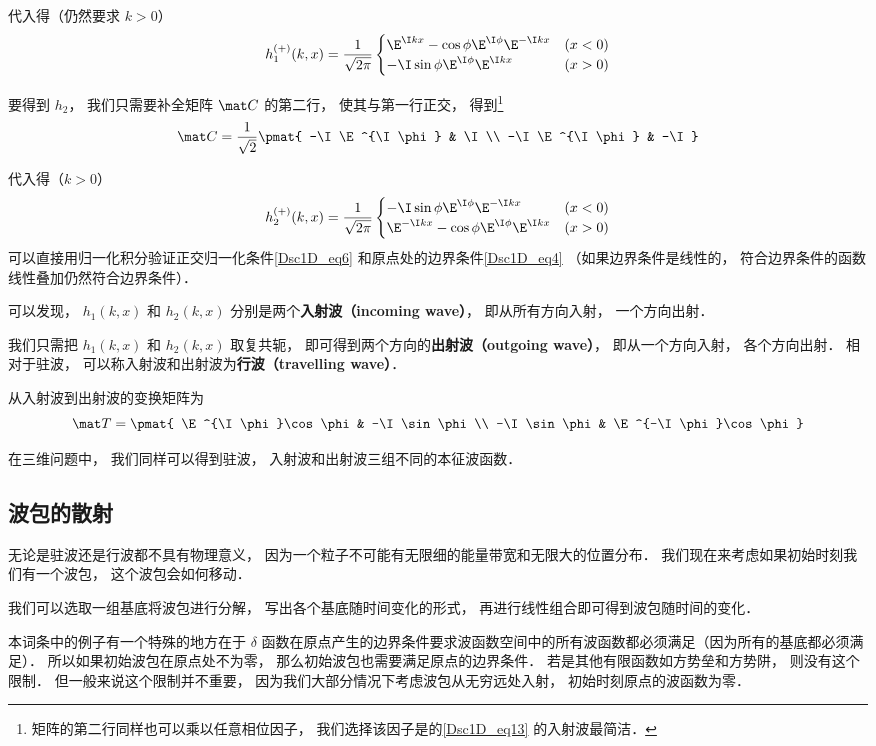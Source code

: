 代入得（仍然要求 $k > 0$）
\begin{equation}\label{Dsc1D_eq11}
h_1^{(+)}(k, x) =  \frac{1}{\sqrt{2\pi}}
\begin{cases}
\E^{\I kx} - \cos\phi \E^{\I\phi} \E^{-\I k x} & (x < 0) \\
-\I\sin\phi\E^{\I\phi} \E^{\I kx}  & (x > 0)
\end{cases}
\end{equation}

要得到 $h_2$， 我们只需要补全矩阵 $\mat C$ 的第二行， 使其与第一行正交， 得到\footnote{矩阵的第二行同样也可以乘以任意相位因子， 我们选择该因子是的\autoref{Dsc1D_eq13} 的入射波最简洁．}
\begin{equation}
\mat C = \frac{1}{\sqrt{2}}\pmat{
-\I\E^{\I \phi} & \I \\
-\I\E^{\I \phi} & -\I
}\end{equation}

代入得（$k > 0$）
\begin{equation}\label{Dsc1D_eq13}
h_2^{(+)}(k, x) =  \frac{1}{\sqrt{2\pi}}
\begin{cases}
-\I\sin\phi\E^{\I\phi}\E^{-\I kx} &(x < 0) \\
\E^{-\I kx} - \cos\phi \E^{\I \phi} \E^{\I kx} &(x > 0)
\end{cases}
\end{equation}
可以直接用归一化积分验证正交归一化条件\autoref{Dsc1D_eq6} 和原点处的边界条件\autoref{Dsc1D_eq4} （如果边界条件是线性的， 符合边界条件的函数线性叠加仍然符合边界条件）．

可以发现， $h_1(k, x)$ 和 $h_2(k, x)$ 分别是两个\textbf{入射波（incoming wave）}， 即从所有方向入射， 一个方向出射．

我们只需把 $h_1(k, x)$ 和 $h_2(k, x)$ 取复共轭， 即可得到两个方向的\textbf{出射波（outgoing wave）}， 即从一个方向入射， 各个方向出射． 相对于驻波， 可以称入射波和出射波为\textbf{行波（travelling wave）}．

从入射波到出射波的变换矩阵为
\begin{equation}
\mat T = \pmat{
\E^{\I\phi}\cos\phi & -\I \sin\phi \\
-\I \sin\phi & \E^{-\I\phi}\cos\phi
}\end{equation}

在三维问题中， 我们同样可以得到驻波， 入射波和出射波三组不同的本征波函数．

\subsection{波包的散射}
无论是驻波还是行波都不具有物理意义， 因为一个粒子不可能有无限细的能量带宽和无限大的位置分布． 我们现在来考虑如果初始时刻我们有一个波包， 这个波包会如何移动．

我们可以选取一组基底将波包进行分解， 写出各个基底随时间变化的形式， 再进行线性组合即可得到波包随时间的变化．

本词条中的例子有一个特殊的地方在于 $\delta$ 函数在原点产生的边界条件要求波函数空间中的所有波函数都必须满足（因为所有的基底都必须满足）． 所以如果初始波包在原点处不为零， 那么初始波包也需要满足原点的边界条件． 若是其他有限函数如方势垒和方势阱， 则没有这个限制． 但一般来说这个限制并不重要， 因为我们大部分情况下考虑波包从无穷远处入射， 初始时刻原点的波函数为零．


